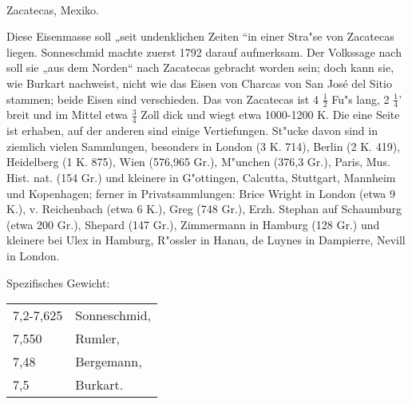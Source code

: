 \documentclass[a4paper, 11pt, oneside]{article}
\begin{document}
\paragraph{}
Zacatecas, Mexiko.

Diese Eisenmasse soll „seit undenklichen Zeiten “in einer Stra"se von Zacatecas liegen. Sonneschmid machte zuerst 1792 darauf aufmerksam. Der Volkssage nach soll sie „aus dem Norden“ nach Zacatecas gebracht worden sein; doch kann sie, wie Burkart nachweist, nicht wie das Eisen von Charcas von San José del Sitio stammen; beide Eisen sind verschieden. Das von Zacatecas ist 4 $\frac{1}{2}$ Fu"s lang, 2 $\frac{1}{4}$' breit und im Mittel etwa $\frac{3}{4}$ Zoll dick und wiegt etwa 1000-1200 K. Die eine Seite ist erhaben, auf der anderen sind einige Vertiefungen. St"ucke davon sind in ziemlich vielen Sammlungen, besonders in London (3 K. 714), Berlin (2 K. 419), Heidelberg (1 K. 875), Wien (576,965 Gr.), M"unchen (376,3 Gr.), Paris, Mus. Hist. nat. (154 Gr.) und kleinere in G"ottingen, Calcutta, Stuttgart, Mannheim und Kopenhagen; ferner in Privatsammlungen: Brice Wright in London (etwa 9 K.), v. Reichenbach (etwa 6 K.), Greg (748 Gr.), Erzh. Stephan auf Schaumburg (etwa 200 Gr.), Shepard (147 Gr.), Zimmermann in Hamburg (128 Gr.) und kleinere bei Ulex in Hamburg, R"ossler in Hanau, de Luynes in Dampierre, Nevill in London.

Spezifisches Gewicht:  
\begin{table}[!ht]
    \centering
    \begin{tabular}{l l}
        7,2-7,625 & Sonneschmid,\\
        7,550 & Rumler,\\
        7,48 & Bergemann,\\
        7,5 & Burkart.
    \end{tabular}
\end{table}
\end{document}
